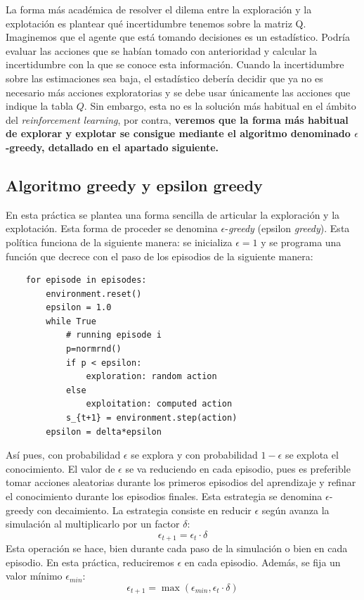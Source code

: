\documentclass{article}
\begin{document}
La forma más académica de resolver el dilema entre la exploración y la explotación es plantear qué incertidumbre tenemos sobre la matriz Q. Imaginemos que el agente que está tomando decisiones es un estadístico. Podría evaluar las acciones que se habían tomado con anterioridad y calcular la incertidumbre con la que se conoce esta información. Cuando la incertidumbre sobre las estimaciones sea  baja, el estadístico debería decidir que ya no es necesario más acciones exploratorias y se debe usar únicamente las acciones que indique la tabla $Q$. Sin embargo, esta no es la solución más habitual en el ámbito del \textit{reinforcement learning}, por contra, \textbf{veremos que la forma más habitual de explorar y explotar se consigue mediante el algoritmo denominado $\epsilon$-greedy, detallado en el apartado siguiente.}

\subsection{Algoritmo greedy y epsilon greedy}
En esta práctica se plantea una forma sencilla de articular la exploración y la explotación. Esta forma de proceder se denomina $\epsilon$-\textit{greedy} (epsilon \textit{greedy}). Esta política funciona de la siguiente manera: se inicializa $\epsilon=1$ y se programa una función que decrece con el paso de los episodios de la siguiente manera:
\begin{verbatim}
    for episode in episodes:
        environment.reset()
        epsilon = 1.0
        while True
            # running episode i
            p=normrnd()
            if p < epsilon:
                exploration: random action
            else
                exploitation: computed action
            s_{t+1} = environment.step(action)
        epsilon = delta*epsilon
\end{verbatim}

Así pues, con probabilidad $\epsilon$ se explora y con probabilidad $1-\epsilon$ se explota el conocimiento. El valor de $\epsilon$ se va reduciendo en cada episodio, pues es preferible tomar acciones aleatorias durante los primeros episodios del aprendizaje y refinar el conocimiento durante los episodios finales. Esta estrategia se denomina $\epsilon$-greedy con decaimiento. La estrategia consiste en reducir $\epsilon$ según avanza la simulación al multiplicarlo por un factor $\delta$:
\begin{equation}
    \epsilon_{t+1}= \epsilon_{t}\cdot\delta
\end{equation}
Esta operación se hace, bien durante cada paso de la simulación o bien en cada episodio. En esta práctica, reduciremos $\epsilon$ en cada episodio. Además, se fija un valor mínimo $\epsilon_{min}$:
\begin{equation}
    \epsilon_{t+1}= \max(\epsilon_{min}, \epsilon_{t}\cdot\delta)
\end{equation}
\end{document}
